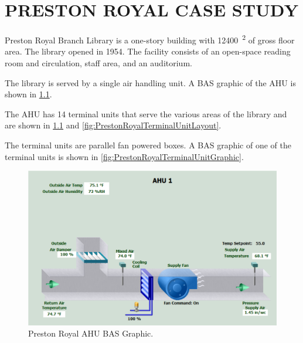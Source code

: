 \chapter{\texorpdfstring{\MakeUppercase{Preston Royal Case Study}}{Preston Royal Case Study}}

Preston Royal Branch Library is a one-story building with
\SI{12400}{\feet\squared} of gross floor area. The library opened in 1954. The
facility consists of an open-space reading room and circulation, staff area,
and an auditorium.

The library is served by a single air handling unit. A BAS graphic of
the AHU is shown in \figref{} \ref{fig:PrestonRoyalAHUGraphic}. 

The AHU has 14 terminal units that serve the various areas of the
library and are shown in \figref{} \ref{fig:PrestonRoyalAHUGraphic} and
\ref{fig:PrestonRoyalTerminalUnitLayout}.

The terminal units are parallel fan powered boxes. A BAS graphic of one
of the terminal units is shown in \figref{}
\ref{fig:PrestonRoyalTerminalUnitGraphic}.

\begin{figure}
\centering
\includegraphics[width=\textwidth]{Images/PrestonRoyalAHUGraphic.PNG}
\caption{Preston Royal AHU BAS Graphic.}
\label{fig:PrestonRoyalAHUGraphic}
\end{figure}

